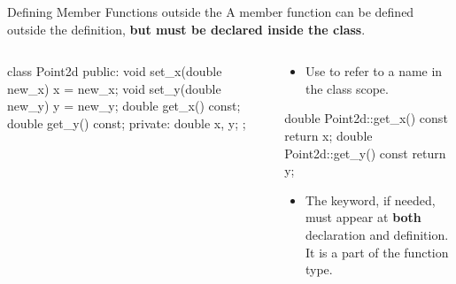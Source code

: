 \documentclass{beamer}
\begin{document}
\begin{frame}[fragile]{Defining Member Functions outside the \class}
    A member function can be defined outside the \class definition, \textbf{but must be declared inside the class}.
    \begin{columns}
        \begin{column}{0.5\linewidth}
            \begin{cpp}
class Point2d {
 public:
  void set_x(double new_x) {
    x = new_x;
  }
  void set_y(double new_y) {
    y = new_y;
  }
  double get_x() const;
  double get_y() const;
 private:
  double x, y;
};
            \end{cpp}        
        \end{column}
        \begin{column}{0.5\linewidth}
            \begin{itemize}
                \item Use  to refer to a name in the class scope.
            \end{itemize}
            \begin{cpp}
double Point2d::get_x() const {
  return x;
}
double Point2d::get_y() const {
  return y;
}
            \end{cpp}
            \begin{itemize}
                \item The \const keyword, if needed, must appear at \textbf{both} declaration and definition. It is a part of the function type.
            \end{itemize}
        \end{column}
    \end{columns}
\end{frame}
\end{document}
